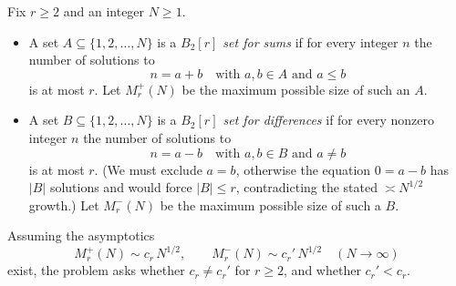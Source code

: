 Fix $r\ge 2$ and an integer $N\ge 1$.

\begin{itemize}
\item A set $A\subseteq\{1,2,\dots,N\}$ is a \emph{$B_2[r]$ set for sums} if for every integer $n$ the number of solutions to
\[
 n=a+b\quad\text{with }a,b\in A\text{ and }a\le b
\]
is at most $r$.
Let $M_r^{+}(N)$ be the maximum possible size of such an $A$.

\item A set $B\subseteq\{1,2,\dots,N\}$ is a \emph{$B_2[r]$ set for differences} if for every nonzero integer $n$ the number of solutions to
\[
 n=a-b\quad\text{with }a,b\in B\text{ and }a\ne b
\]
is at most $r$.
(We must exclude $a=b$, otherwise the equation $0=a-b$ has $|B|$ solutions and would force $|B|\le r$, contradicting the stated $\asymp N^{1/2}$ growth.)
Let $M_r^{-}(N)$ be the maximum possible size of such a $B$.
\end{itemize}

Assuming the asymptotics
\[
 M_r^{+}(N) \sim c_r\, N^{1/2},\qquad M_r^{-}(N) \sim c_r'\, N^{1/2}
\quad (N\to\infty)
\]
exist, the problem asks whether $c_r\ne c_r'$ for $r\ge 2$, and whether $c_r'<c_r$.
